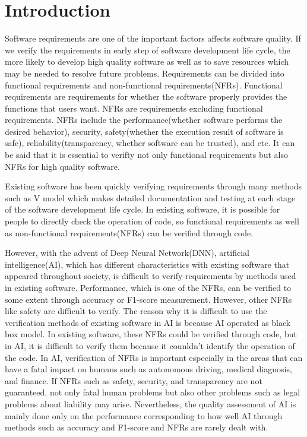 \documentclass[journal,article,submit,moreauthors,pdftex]{Definitions/mdpi}
\begin{document}
\setcounter{section}

\section{Introduction}

Software requirements are one of the important factors affects software quality.
If we verify the requirements in early step of software development life cycle, the more likely to develop high quality software as well as to save resources which may be needed to resolve future problems.
Requirements can be divided into functional requirements and non-functional requirements(NFRs).
Functional requirements are requirements for whether the software properly provides the functions that users want.
NFRs are requirements excluding functional requirements. NFRs include the performance(whether software performs the desired behavior), security, safety(whether the execution result of software is safe), reliability(transparency, whether software can be trusted), and etc. %
It can be said that it is essential to verifty not only functional requirements but also NFRs for high quality software.

Existing software has been quickly verifying requirements through many methods such as V model which makes detailed documentation and testing at each stage of the software development life cycle.
In existing software, it is possible for people to directly check the operation of code, so functional requirements as well as non-functional requirements(NFRs) can be verified through code.\

However, with the advent of Deep Neural Network(DNN), artificial intelligence(AI), which has different characteristics with existing software that appeared throughout society, is difficult to verify requirements by methods used in existing software.
Performance, which is one of the NFRs, can be verified to some extent through accuracy or F1-score measurement. However, other NFRs like safety are difficult to verify.
The reason why it is difficult to use the verification methods of existing software in AI is because AI operated as black box model. In existing software, these NFRs could be verified through code, but in AI, it is difficult to verify them because it counldn't identify the operation of the code.
In AI, verification of NFRs is important especially in the areas that can have a fatal impact on humans such as autonomous driving, medical diagnosis, and finance.
If NFRs such as safety, security, and transparency are not guaranteed, not only fatal human problems but also other problems such as legal problems about liability may arise.
Nevertheless, the quality assessment of AI is mainly done only on the performance corresponding to how well AI through methods such as accuracy and F1-score and NFRs are rarely dealt with.
\end{document}

